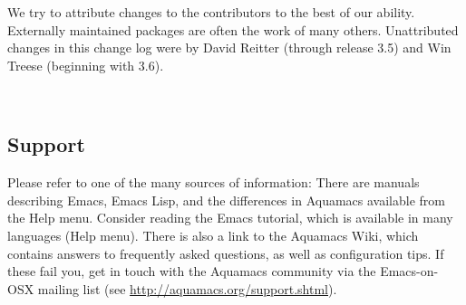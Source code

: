 \documentclass[11pt,letterpaper]{article}
\begin{document}
{\begin{figure*}[!b]
{\begin{minipage}{0.95\textwidth}
We try to attribute changes to the contributors to the best of our
ability. Externally maintained packages are often the work of many
others. Unattributed changes in this change log were by David Reitter
(through release 3.5) and Win Treese (beginning with 3.6).

\vspace{8pt}
\end{minipage}
~~}
\end{figure*}
}



\subsection{Support}
Please refer to one of the many sources of information: There are
manuals describing Emacs, Emacs Lisp, and the differences in Aquamacs
available from the Help menu.  Consider reading the Emacs tutorial,
which is available in many languages (Help menu).  There is also a
link to the Aquamacs Wiki, which contains answers to frequently asked
questions, as well as configuration tips.  If these fail you, get in
touch with the Aquamacs community via the Emacs-on-OSX mailing list
(see \url{http://aquamacs.org/support.shtml}).
\end{document}

